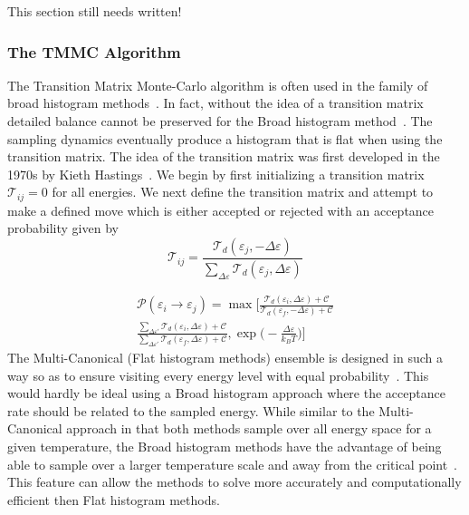 \documentclass[letterpaper,twocolumn,amsmath,amssymb,pre,aps,10pt]{revtex4-1}
\begin{document}
This section still needs written!

\subsubsection{The TMMC Algorithm}

The Transition Matrix Monte-Carlo algorithm is often used in the family 
of broad histogram methods~\cite{swendsen1999transition}.  In fact, 
without the idea of a transition matrix detailed balance cannot be 
preserved for the Broad histogram method~\cite{wang1999broad}.  The 
sampling dynamics eventually produce a histogram that is flat when 
using the transition matrix.  The idea of the transition matrix was 
first developed in the 1970s by Kieth 
Hastings~\cite{hastings1970monte}.  We begin by first initializing a 
transition matrix $\mathcal{T}_{ij}=0$ for all energies.  We next 
define the transition matrix and attempt to make a defined move which 
is either accepted or rejected with an acceptance probability given by 
\begin{equation} \mathcal{T}_{ij} = 
\frac{\mathcal{T}_{d}(\varepsilon_j,-\Delta{\varepsilon})} 
{\sum\limits_{\Delta{\varepsilon}}\mathcal{T}_{d} 
(\varepsilon_j,\Delta{\varepsilon})} 
\end{equation} 

\begin{equation} 
\begin{split} \mathcal{P}(\varepsilon_i \rightarrow \varepsilon_j) = 
\max\bigg[\frac{\mathcal{T}_{d}(\varepsilon_i,\Delta{\varepsilon}) 
+\mathcal{C}}{\mathcal{T}_{d}(\varepsilon_f,-\Delta{\varepsilon}) 
+\mathcal{C}}\\\frac{\sum\limits_{\Delta{\varepsilon'}}\mathcal{T}_{d} 
(\varepsilon_i,\Delta{\varepsilon})+\mathcal{C}} 
{\sum\limits_{\Delta{\varepsilon'}}\mathcal{T}_{d}(\varepsilon_f, 
\Delta{\varepsilon})+\mathcal{C}},\exp{\bigg(-\frac{\Delta{\varepsilon}} 
{k_{B}T}\bigg)}\bigg] 
\end{split} 
\end{equation} 
The Multi-Canonical (Flat histogram methods) ensemble is designed in such a 
way so as to ensure visiting every energy level with equal 
probability~\cite{swendsen1999transition}.  This would hardly be ideal 
using a Broad histogram approach where the acceptance rate should be 
related to the sampled energy.  While similar to the Multi-Canonical 
approach in that both methods sample over all energy space for a given 
temperature, the Broad histogram methods have the advantage of being 
able to sample over a larger temperature scale and away from the 
critical point~\cite{Broadhistogram,BroadHistogram2}.  This feature can 
allow the methods to solve more accurately and computationally 
efficient then Flat histogram methods.
\end{document}
